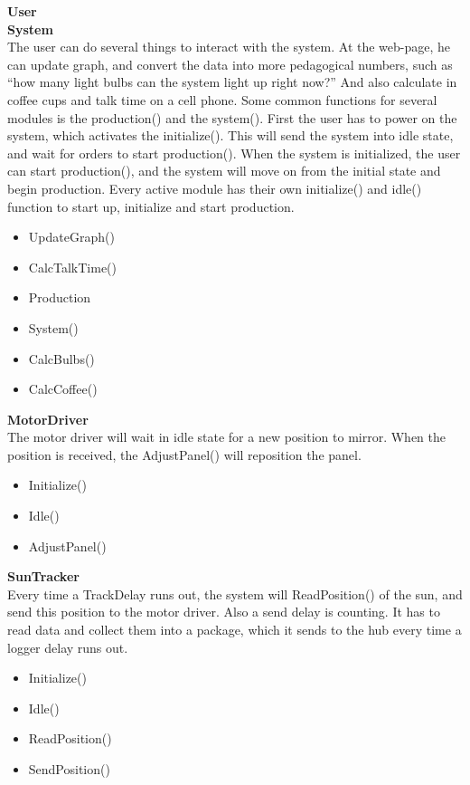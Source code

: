 \documentclass[12pt,a4paper]{report}
\begin{document}
\textbf{User} \\
\textbf{System}\\

The user can do several things to interact with the system. At the web-page, he can update graph, and convert the data into more pedagogical numbers, such as “how many light bulbs can the system light up right now?” And also calculate in coffee cups and talk time on a cell phone.
Some common functions for several modules is the production() and the system(). First the user has to power on the system, which activates the initialize(). This will send the system into idle state, and wait for orders to start production().
When the system is initialized, the user can start production(), and the system will move on from the initial state and begin production. Every active module has their own initialize() and idle() function to start up, initialize and start production.\\

\begin{itemize}
\item UpdateGraph()
\item CalcTalkTime()
\item Production
\item System()
\item CalcBulbs()
\item CalcCoffee()
\end{itemize}

\textbf{MotorDriver}
\\The motor driver will wait in idle state for a new position to mirror. When the position is received, the AdjustPanel() will reposition the panel.

\begin{itemize}
\item Initialize()
\item Idle()
\item AdjustPanel()
\end{itemize}

\textbf{SunTracker}
\\Every time a TrackDelay runs out, the system will ReadPosition() of the sun, and send this position to the motor driver. Also a send delay is counting. It has to read data and collect them into a package, which it sends to the hub every time a logger delay runs out.

\begin{itemize}
\item Initialize()
\item Idle()
\item ReadPosition()
\item SendPosition()
\end{itemize}
\end{document}
